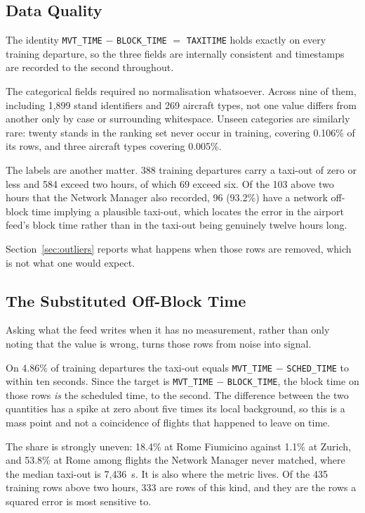 \documentclass[
  manuscript=article,
  layout=preprint,
  year=2026,
  volume=x,
]{extra/joas}
\begin{document}
\subsection{Data Quality}
The identity \texttt{MVT\_TIME} $-$ \texttt{BLOCK\_TIME} $=$ \texttt{TAXITIME} holds
exactly on every training departure, so the three fields are internally consistent and
timestamps are recorded to the second throughout.

The categorical fields required no normalisation whatsoever. Across nine of them,
including 1{,}899 stand identifiers and 269 aircraft types, not one value differs from
another only by case or surrounding whitespace. Unseen categories are similarly rare:
twenty stands in the ranking set never occur in training, covering 0.106\% of its rows,
and three aircraft types covering 0.005\%.

The labels are another matter. 388 training departures carry a taxi-out of zero or less
and 584 exceed two hours, of which 69 exceed six. Of the 103 above two hours that the
Network Manager also recorded, 96 (93.2\%) have a network off-block time implying a
plausible taxi-out, which locates the error in the airport feed's block time rather than
in the taxi-out being genuinely twelve hours long.

Section~\ref{sec:outliers} reports what happens when those rows are removed, which is
not what one would expect.

\subsection{The Substituted Off-Block Time}
\label{sec:substitution}
Asking what the feed writes when it has no measurement, rather than only noting that the
value is wrong, turns those rows from noise into signal.

On 4.86\% of training departures the taxi-out equals \texttt{MVT\_TIME} $-$
\texttt{SCHED\_TIME} to within ten seconds. Since the target is \texttt{MVT\_TIME} $-$
\texttt{BLOCK\_TIME}, the block time on those rows \emph{is} the scheduled time, to the
second. The difference between the two quantities has a spike at zero about five times
its local background, so this is a mass point and not a coincidence of flights that
happened to leave on time.

The share is strongly uneven: 18.4\% at Rome Fiumicino against 1.1\% at Zurich, and
53.8\% at Rome among flights the Network Manager never matched, where the median taxi-out
is 7{,}436~s. It is also where the metric lives. Of the 435 training rows above two hours,
333 are rows of this kind, and they are the rows a squared error is most sensitive to.
\end{document}
